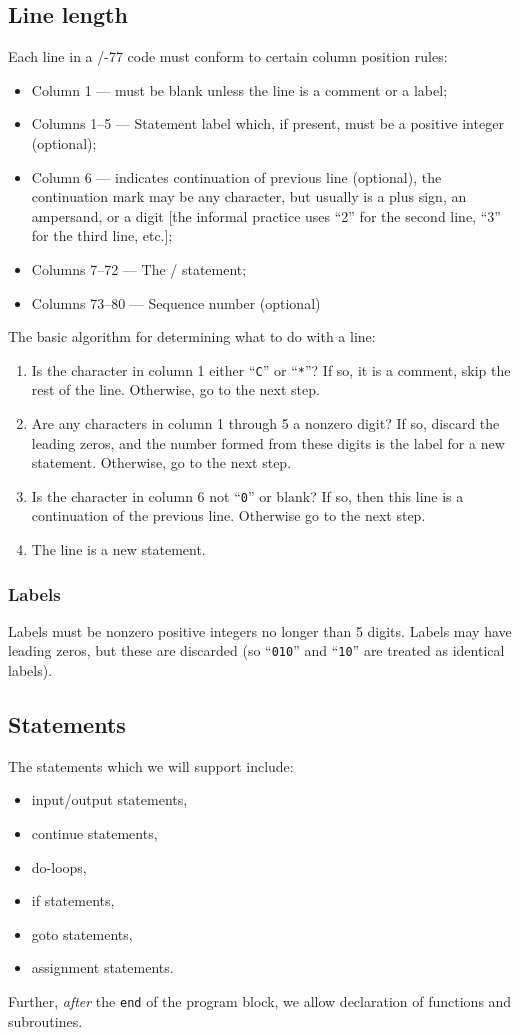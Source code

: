 \subsection{Line length}
Each line in a \FORTRAN/-77 code must conform to certain column position
rules:
\begin{itemize}
\item Column 1 --- must be blank unless the line is a comment or a label;
\item Columns 1--5 --- Statement label which, if present, must be a
  positive integer (optional);
\item Column 6 --- indicates continuation of previous line (optional),
  the continuation mark may be any character, but usually is a plus
  sign, an ampersand, or a digit [the informal practice uses
  ``2'' for the second line, ``3'' for the third line, etc.];
\item Columns 7--72 --- The \FORTRAN/ statement;
\item Columns 73--80 --- Sequence number (optional)
\end{itemize}
The basic algorithm for determining what to do with a line:
\begin{enumerate}
\item Is the character in column 1 either ``\texttt{C}'' or
  ``\texttt{*}''? If so, it is a comment, skip the rest of the
  line. Otherwise, go to the next step.
\item Are any characters in column 1 through 5 a nonzero digit? If so,
  discard the leading zeros, and the number formed from these digits is
  the label for a new statement. Otherwise, go to the next step.
\item Is the character in column 6 not ``\texttt{0}'' or blank? If so,
  then this line is a continuation of the previous line. Otherwise go to
  the next step.
\item The line is a new statement.
\end{enumerate}

\subsubsection{Labels}
Labels must be nonzero positive integers no longer than 5 digits. Labels
may have leading zeros, but these are discarded (so ``\texttt{010}'' and
``\texttt{10}'' are treated as identical labels).

\subsection{Statements}
The statements which we will support include:
\begin{itemize}
\item input/output statements,
\item continue statements,
\item do-loops,
\item if statements,
\item goto statements,
\item assignment statements.
\end{itemize}
Further, \emph{after} the \texttt{end} of the program block, we allow
declaration of functions and subroutines.

